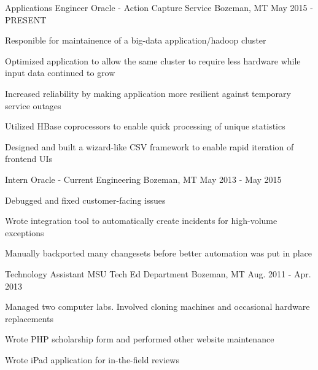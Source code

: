 

\begin{cventries}

  \cventry
    {Applications Engineer} %
    {Oracle - Action Capture Service} %
    {Bozeman, MT} %
    {May 2015 - PRESENT} %
    {
      \begin{cvitems} %
        \item {Responible for maintainence of a big-data application/hadoop cluster}
        \item {Optimized application to allow the same cluster to require less hardware while input data continued to grow}
        \item {Increased reliability by making application more resilient against temporary service outages}
        \item {Utilized HBase coprocessors to enable quick processing of unique statistics}
        \item {Designed and built a wizard-like CSV framework to enable rapid iteration of frontend UIs}
      \end{cvitems}
    }

  \cventry
    {Intern} %
    {Oracle - Current Engineering} %
    {Bozeman, MT} %
    {May 2013 - May 2015} %
    {
      \begin{cvitems} %
        \item {Debugged and fixed customer-facing issues}
        \item {Wrote integration tool to automatically create incidents for high-volume exceptions}
        \item {Manually backported many changesets before better automation was put in place}
      \end{cvitems}
    }

  \cventry
    {Technology Assistant} %
    {MSU Tech Ed Department} %
    {Bozeman, MT} %
    {Aug. 2011 - Apr. 2013} %
    {
      \begin{cvitems} %
        \item {Managed two computer labs. Involved cloning machines and occasional hardware replacements}
        \item {Wrote PHP scholarship form and performed other website maintenance}
        \item {Wrote iPad application for in-the-field reviews}
      \end{cvitems}
    }

\end{cventries}
